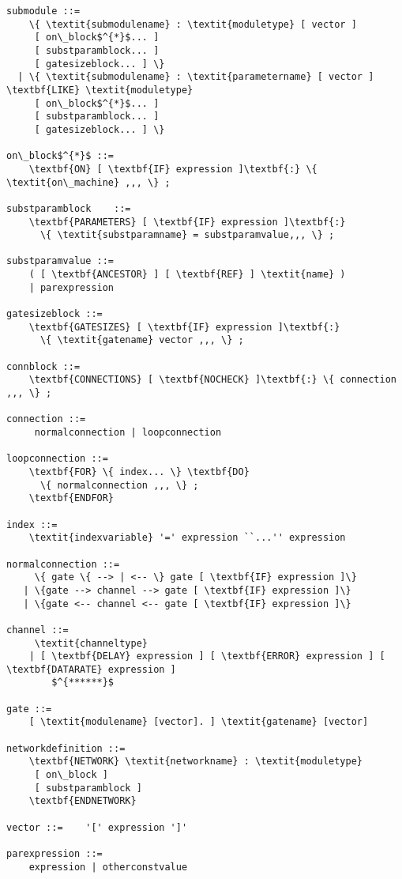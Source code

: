 \begin{Verbatim}[commandchars=\\\{\}]
submodule ::=
    \{ \textit{submodulename} : \textit{moduletype} [ vector ]
     [ on\_block$^{*}$... ] 
     [ substparamblock... ]
     [ gatesizeblock... ] \} 
  | \{ \textit{submodulename} : \textit{parametername} [ vector ] \textbf{LIKE} \textit{moduletype}
     [ on\_block$^{*}$... ] 
     [ substparamblock... ]
     [ gatesizeblock... ] \} 

on\_block$^{*}$ ::= 
    \textbf{ON} [ \textbf{IF} expression ]\textbf{:} \{ \textit{on\_machine} ,,, \} ;

substparamblock    ::= 
    \textbf{PARAMETERS} [ \textbf{IF} expression ]\textbf{:} 
      \{ \textit{substparamname} = substparamvalue,,, \} ;

substparamvalue ::=
    ( [ \textbf{ANCESTOR} ] [ \textbf{REF} ] \textit{name} )
    | parexpression

gatesizeblock ::= 
    \textbf{GATESIZES} [ \textbf{IF} expression ]\textbf{:} 
      \{ \textit{gatename} vector ,,, \} ;

connblock ::= 
    \textbf{CONNECTIONS} [ \textbf{NOCHECK} ]\textbf{:} \{ connection ,,, \} ;

connection ::= 
     normalconnection | loopconnection

loopconnection ::= 
    \textbf{FOR} \{ index... \} \textbf{DO} 
      \{ normalconnection ,,, \} ;
    \textbf{ENDFOR}

index ::= 
    \textit{indexvariable} '=' expression ``...'' expression

normalconnection ::= 
     \{ gate \{ --> | <-- \} gate [ \textbf{IF} expression ]\}
   | \{gate --> channel --> gate [ \textbf{IF} expression ]\}
   | \{gate <-- channel <-- gate [ \textbf{IF} expression ]\}

channel ::=
     \textit{channeltype}
    | [ \textbf{DELAY} expression ] [ \textbf{ERROR} expression ] [ \textbf{DATARATE} expression ]  
        $^{******}$

gate ::= 
    [ \textit{modulename} [vector]. ] \textit{gatename} [vector]

networkdefinition ::=
    \textbf{NETWORK} \textit{networkname} : \textit{moduletype}
     [ on\_block ]
     [ substparamblock ]
    \textbf{ENDNETWORK}

vector ::=    '[' expression ']'

parexpression ::=
    expression | otherconstvalue


\end{Verbatim}
